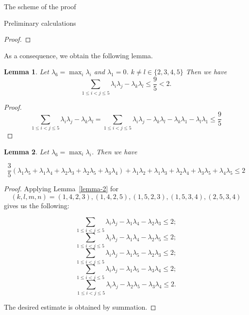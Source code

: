 \documentclass[12pt]{article}
\newtheorem{lemma}{Lemma}[section]
\begin{document}
\begin{section}{The scheme of the proof}
\begin{section}{Preliminary calculations}
\begin{proof}
        
    \end{proof}
    As a consequence, we obtain the following lemma. 
     \begin{lemma}
    \label{lemma3.5}
         Let $\lambda_{6} = \max_{i}\lambda_{i}$ and $\lambda_{1}=0$. $k\neq l \in \{2,3,4,5\}$ Then we have 
         $$
            \sum_{1\leq i<j\leq 5}\lambda_{i}\lambda_{j}  - \lambda_{k}\lambda_{l} \leq \frac{9}{5} 
 < 2.
         $$
    \end{lemma}

    \begin{proof}
          $$
            \sum_{1\leq i<j\leq 5}\lambda_{i}\lambda_{j}  - \lambda_{k}\lambda_{l} = \sum_{1\leq i<j\leq 5}\lambda_{i}\lambda_{j}  - \lambda_{k}\lambda_{l} - \lambda_{k}\lambda_{1} - \lambda_{l} \lambda_{1}  \leq \frac{9}{5} 
         $$
    \end{proof}

    \begin{lemma}
    \label{lemma3.6}
         Let $\lambda_{6} = \max_{i}\lambda_{i}$. Then we have
         
        $$
           \frac{3}{5}(\lambda_{1}\lambda_{5} + \lambda_{1}\lambda_{4} +\lambda_{2}\lambda_{3} + \lambda_{2}\lambda_{5} + \lambda_{3}\lambda_{4} ) + \lambda_{1}\lambda_{2} + \lambda_{1}\lambda_{3} + \lambda_{2}\lambda_{4} +\lambda_{3}\lambda_{5} + \lambda_{4}\lambda_{5} \leq 2
        $$
    \end{lemma}

    \begin{proof}
        Applying Lemma~\ref{lemma-2} for $$(k,l,m,n) = (1,4,2,3),
        (1,4,2,5),(1,5,2,3), (1,5,3,4), (2,5,3,4)$$ gives us the following:

        $$
            \sum_{1\leq i<j\leq 5}\lambda_{i}\lambda_{j} - \lambda_{1}\lambda_{4} - \lambda_{2}\lambda_{3}\leq 2;
        $$
        $$
            \sum_{1\leq i<j\leq 5}\lambda_{i}\lambda_{j} - \lambda_{1}\lambda_{4} - \lambda_{2}\lambda_{5}\leq 2;
        $$
        $$
            \sum_{1\leq i<j\leq 5}\lambda_{i}\lambda_{j} - \lambda_{1}\lambda_{5} - \lambda_{2}\lambda_{3}\leq 2;
        $$
        $$
            \sum_{1\leq i<j\leq 5}\lambda_{i}\lambda_{j} - \lambda_{1}\lambda_{5} - \lambda_{3}\lambda_{4}\leq 2;
        $$
        $$
            \sum_{1\leq i<j\leq 5}\lambda_{i}\lambda_{j} - \lambda_{2}\lambda_{5} - \lambda_{3}\lambda_{4}\leq 2.
        $$

        The desired estimate is obtained by summation.
        
    \end{proof}
    

\end{section}
\end{section}
\end{document}
